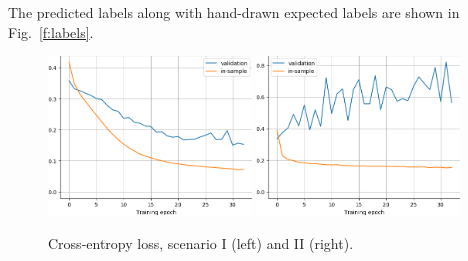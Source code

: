 \documentclass[12pt,a4paper]{article}
\begin{document}
    
    The predicted labels
    along with hand-drawn expected labels
    are shown in Fig.~\ref{f:labels}.
    
    
    
    
    \begin{figure}[p]
        \centering
        \includegraphics[width=0.48\textwidth]{images/data_onlydida/last_history}
        \hfill
        \includegraphics[width=0.48\textwidth]{images/data_withjosm/last_history}
        
        \caption{Cross-entropy loss, scenario I (left) and II (right).}
        \label{f:loss}
    \end{figure}
    
\end{document}
